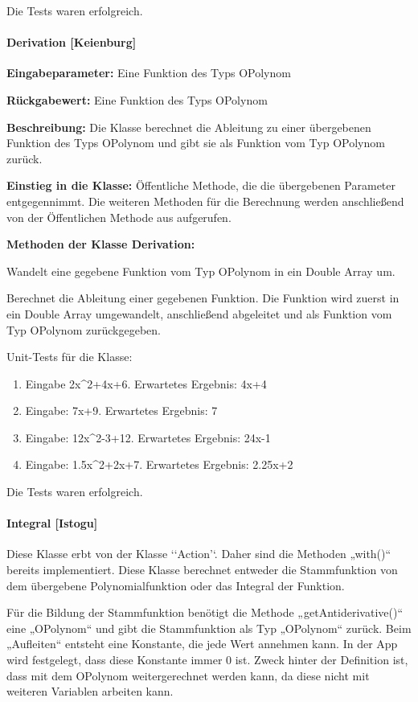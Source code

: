 Die Tests waren erfolgreich.

\paragraph{Derivation [Keienburg]}

\textbf{Eingabeparameter: }Eine Funktion des Typs OPolynom

\textbf{Rückgabewert:} Eine Funktion des Typs OPolynom

\textbf{Beschreibung:} Die Klasse berechnet die Ableitung zu einer übergebenen Funktion des Typs OPolynom und gibt sie als Funktion vom Typ OPolynom zurück. 

\textbf{Einstieg in die Klasse: }Öffentliche Methode, die die übergebenen Parameter entgegennimmt. Die weiteren Methoden für die Berechnung werden anschließend von der Öffentlichen Methode aus aufgerufen. 

\textbf{Methoden der Klasse Derivation: }

 Wandelt eine gegebene Funktion vom Typ OPolynom in ein Double Array um. 

Berechnet die Ableitung einer gegebenen Funktion. Die Funktion wird zuerst in ein Double Array umgewandelt, anschließend abgeleitet und als Funktion vom Typ OPolynom zurückgegeben. 

Unit-Tests für die Klasse: 

\begin{enumerate}
\item Eingabe 2x\^{}2+4x+6. Erwartetes Ergebnis: 4x+4
\item Eingabe: 7x+9. Erwartetes Ergebnis: 7
\item Eingabe: 12x\^{}2-3+12. Erwartetes Ergebnis: 24x-1
\item Eingabe: 1.5x\^{}2+2x+7. Erwartetes Ergebnis: 2.25x+2
\end{enumerate}  

Die Tests waren erfolgreich.

\paragraph{Integral [Istogu]}

Diese Klasse erbt von der Klasse ‘‘Action’‘. Daher sind die Methoden „with()“ bereits implementiert. Diese Klasse berechnet entweder die Stammfunktion von dem übergebene Polynomialfunktion oder das Integral der Funktion. 

Für die Bildung der Stammfunktion benötigt die Methode „getAntiderivative()“ eine „OPolynom“ und gibt die Stammfunktion als Typ „OPolynom“ zurück. Beim „Aufleiten“ entsteht eine Konstante, die jede Wert annehmen kann. In der App wird festgelegt, dass diese Konstante immer 0 ist. Zweck hinter der Definition ist, dass mit dem OPolynom weitergerechnet werden kann, da diese nicht mit weiteren Variablen arbeiten kann.

